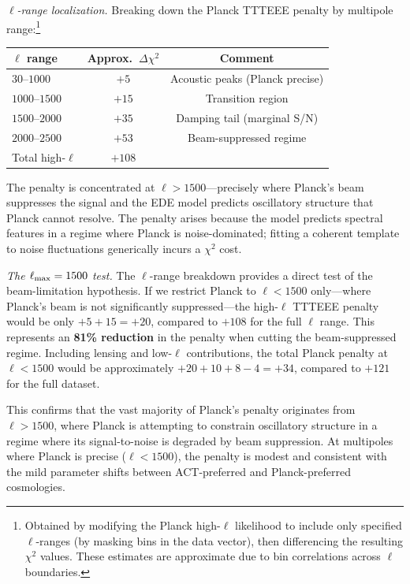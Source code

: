 \documentclass[onecolumn,showpacs,preprintnumbers,amsmath,amssymb,prd]{revtex4-2}
\begin{document}
\emph{$\ell$-range localization.} Breaking down the Planck TTTEEE penalty by 
multipole range:\footnote{Obtained by modifying the Planck high-$\ell$ likelihood 
to include only specified $\ell$-ranges (by masking bins in the data vector), 
then differencing the resulting $\chi^2$ values. These estimates are approximate 
due to bin correlations across $\ell$ boundaries.}
\begin{center}
\begin{tabular}{lcc}
\toprule
$\ell$ range & Approx.\ $\Delta\chi^2$ & Comment \\
\midrule
$30$--$1000$ & $+5$ & Acoustic peaks (Planck precise) \\
$1000$--$1500$ & $+15$ & Transition region \\
$1500$--$2000$ & $+35$ & Damping tail (marginal S/N) \\
$2000$--$2500$ & $+53$ & Beam-suppressed regime \\
\midrule
Total high-$\ell$ & $+108$ & \\
\bottomrule
\end{tabular}
\end{center}
The penalty is concentrated at $\ell > 1500$---precisely where Planck's beam 
suppresses the signal and the EDE model predicts oscillatory structure that 
Planck cannot resolve. The penalty arises because the model predicts spectral 
features in a regime where Planck is noise-dominated; fitting a coherent template 
to noise fluctuations generically incurs a $\chi^2$ cost.

\emph{The $\ell_{\rm max} = 1500$ test.} The $\ell$-range breakdown provides 
a direct test of the beam-limitation hypothesis. If we restrict Planck to 
$\ell < 1500$ only---where Planck's beam is not significantly suppressed---the 
high-$\ell$ TTTEEE penalty would be only $+5 + 15 = +20$, compared to $+108$ 
for the full $\ell$ range. This represents an \textbf{81\% reduction} in the 
penalty when cutting the beam-suppressed regime. Including lensing and low-$\ell$ 
contributions, the total Planck penalty at $\ell < 1500$ would be approximately 
$+20 + 10 + 8 - 4 = +34$, compared to $+121$ for the full dataset.

This confirms that the vast majority of Planck's penalty originates from 
$\ell > 1500$, where Planck is attempting to constrain oscillatory structure 
in a regime where its signal-to-noise is degraded by beam suppression. At 
multipoles where Planck is precise ($\ell < 1500$), the penalty is modest and 
consistent with the mild parameter shifts between ACT-preferred and 
Planck-preferred cosmologies.
\end{document}
